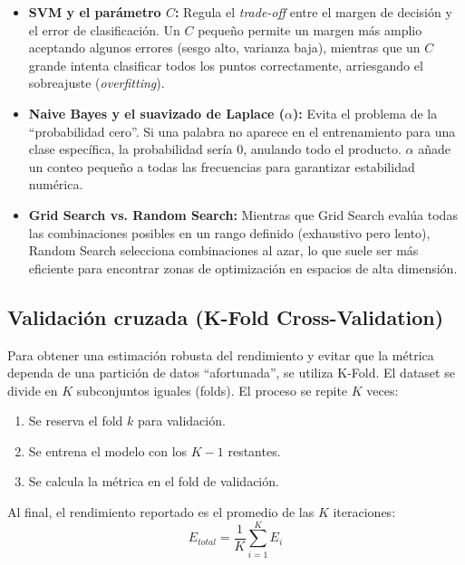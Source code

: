 \begin{itemize}
\item \textbf{SVM y el parámetro $C$:} Regula el \textit{trade-off} entre el margen de decisión y el error de clasificación. Un $C$ pequeño permite un margen más amplio aceptando algunos errores (sesgo alto, varianza baja), mientras que un $C$ grande intenta clasificar todos los puntos correctamente, arriesgando el sobreajuste (\textit{overfitting}).

\item \textbf{Naive Bayes y el suavizado de Laplace ($\alpha$):} Evita el problema de la “probabilidad cero”. Si una palabra no aparece en el entrenamiento para una clase específica, la probabilidad sería $0$, anulando todo el producto. $\alpha$ añade un conteo pequeño a todas las frecuencias para garantizar estabilidad numérica.

\item \textbf{Grid Search vs. Random Search:} Mientras que Grid Search evalúa todas las combinaciones posibles en un rango definido (exhaustivo pero lento), Random Search selecciona combinaciones al azar, lo que suele ser más eficiente para encontrar zonas de optimización en espacios de alta dimensión.
\end{itemize}

\subsection{Validación cruzada (K-Fold Cross-Validation)}
Para obtener una estimación robusta del rendimiento y evitar que la métrica dependa de una partición de datos “afortunada”, se utiliza K-Fold. El dataset se divide en $K$ subconjuntos iguales (folds).
El proceso se repite $K$ veces:\begin{enumerate}
\item Se reserva el fold $k$ para validación.
\item Se entrena el modelo con los $K-1$ restantes.
\item Se calcula la métrica en el fold de validación.
\end{enumerate}
Al final, el rendimiento reportado es el promedio de las $K$ iteraciones:$$E_{total} = \frac{1}{K} \sum_{i=1}^{K} E_i$$

